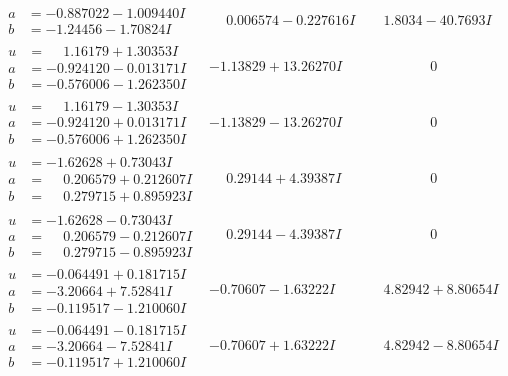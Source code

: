 \documentclass[1p]{elsarticle_modified}
\theoremstyle{definition}
\begin{document}
$$\begin{array}{c|c|c}
\begin{aligned}
a &= -0.887022 - 1.009440 I \\
b &= -1.24456 - 1.70824 I\end{aligned}
 & \phantom{-}0.006574 - 0.227616 I & \phantom{-}1.8034 - 40.7693 I \\ \hline\begin{aligned}
u &= \phantom{-}1.16179 + 1.30353 I \\
a &= -0.924120 - 0.013171 I \\
b &= -0.576006 - 1.262350 I\end{aligned}
 & -1.13829 + 13.26270 I & \phantom{-0.000000 } 0 \\ \hline\begin{aligned}
u &= \phantom{-}1.16179 - 1.30353 I \\
a &= -0.924120 + 0.013171 I \\
b &= -0.576006 + 1.262350 I\end{aligned}
 & -1.13829 - 13.26270 I & \phantom{-0.000000 } 0 \\ \hline\begin{aligned}
u &= -1.62628 + 0.73043 I \\
a &= \phantom{-}0.206579 + 0.212607 I \\
b &= \phantom{-}0.279715 + 0.895923 I\end{aligned}
 & \phantom{-}0.29144 + 4.39387 I & \phantom{-0.000000 } 0 \\ \hline\begin{aligned}
u &= -1.62628 - 0.73043 I \\
a &= \phantom{-}0.206579 - 0.212607 I \\
b &= \phantom{-}0.279715 - 0.895923 I\end{aligned}
 & \phantom{-}0.29144 - 4.39387 I & \phantom{-0.000000 } 0 \\ \hline\begin{aligned}
u &= -0.064491 + 0.181715 I \\
a &= -3.20664 + 7.52841 I \\
b &= -0.119517 - 1.210060 I\end{aligned}
 & -0.70607 - 1.63222 I & \phantom{-}4.82942 + 8.80654 I \\ \hline\begin{aligned}
u &= -0.064491 - 0.181715 I \\
a &= -3.20664 - 7.52841 I \\
b &= -0.119517 + 1.210060 I\end{aligned}
 & -0.70607 + 1.63222 I & \phantom{-}4.82942 - 8.80654 I \\ \hline\begin{aligned}

\end{aligned}
\end{array}$$
\end{document}
